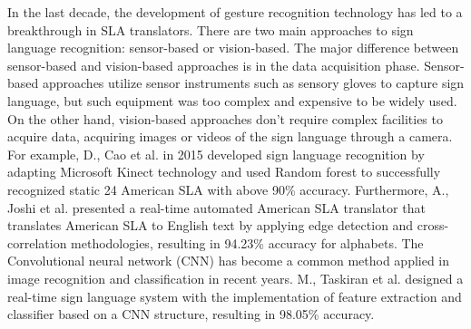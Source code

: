 In the last decade, the development of gesture recognition technology has led to a breakthrough in SLA translators. There are two main approaches to sign language recognition: sensor-based or vision-based\cite{Cheok2019ARO}. The major difference between sensor-based and vision-based approaches is in the data acquisition phase. Sensor-based approaches utilize sensor instruments such as sensory gloves to capture sign language, but such equipment was too complex and expensive to be widely used. On the other hand, vision-based approaches don't require complex facilities to acquire data, acquiring images or videos of the sign language through a camera. For example, D., Cao et al.\cite{7301347} in 2015 developed sign language recognition by adapting Microsoft Kinect technology and used Random forest to successfully recognized static 24 American SLA with above 90\% accuracy. Furthermore, A., Joshi et al.\cite{8088212} presented a real-time automated American SLA translator that translates American SLA to English text by applying edge detection and cross-correlation methodologies, resulting in 94.23\% accuracy for alphabets. The Convolutional neural network (CNN) has become a common method applied in image recognition and classification in recent years. M., Taskiran et al.\cite{8441304} designed a real-time sign language system with the implementation of feature extraction and classifier based on a CNN structure, resulting in 98.05\% accuracy.